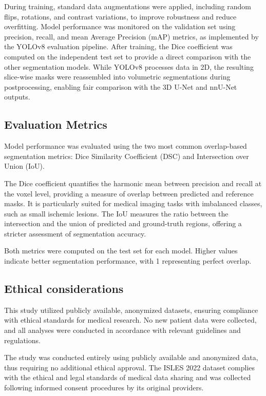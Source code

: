 \documentclass[12pt]{article}
\begin{document}
During training, standard data augmentations were applied, including random flips, rotations, and contrast variations, to improve robustness and reduce overfitting.
%
Model performance was monitored on the validation set using precision, recall, and mean Average Precision (mAP) metrics, as implemented by the YOLOv8 evaluation pipeline.
%
After training, the Dice coefficient was computed on the independent test set to provide a direct comparison with the other segmentation models.
%
While YOLOv8 processes data in 2D, the resulting slice-wise masks were reassembled into volumetric segmentations during postprocessing, enabling fair comparison with the 3D U-Net and nnU-Net outputs.

\subsection{Evaluation Metrics} \label{subsec:metrics}
Model performance was evaluated using the two most common overlap-based segmentation metrics: Dice Similarity Coefficient (DSC) and Intersection over Union (IoU).

The Dice coefficient quantifies the harmonic mean between precision and recall at the voxel level, providing a measure of overlap between predicted and reference masks. It is particularly suited for medical imaging tasks with imbalanced classes, such as small ischemic lesions. The IoU measures the ratio between the intersection and the union of predicted and ground-truth regions, offering a stricter assessment of segmentation accuracy.

Both metrics were computed on the test set for each model. Higher values indicate better segmentation performance, with 1 representing perfect overlap.

\subsection{Ethical considerations} \label{subsec:ethics}
This study utilized publicly available, anonymized datasets, ensuring compliance with ethical standards for medical research. No new patient data were collected, and all analyses were conducted in accordance with relevant guidelines and regulations.

The study was conducted entirely using publicly available and anonymized data, thus requiring no additional ethical approval. The ISLES 2022 dataset complies with the ethical and legal standards of medical data sharing and was collected following informed consent procedures by its original providers.
\end{document}
